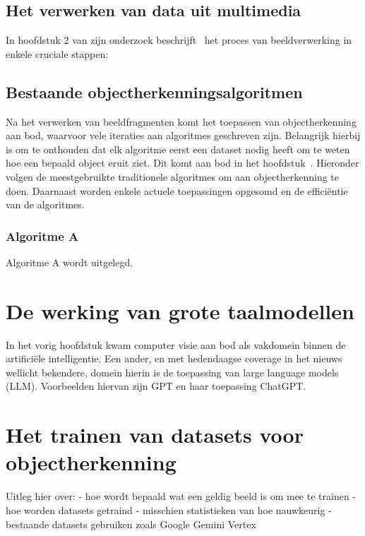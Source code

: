 \subsection{Het verwerken van data uit multimedia}\label{subsec:het-verwerken-van-data}
In hoofdstuk 2 van zijn onderzoek beschrijft~\textcite{Olaoye2024} het proces van beeldverwerking in enkele cruciale stappen:

\subsection{Bestaande objectherkenningsalgoritmen}\label{subsec:bestaande-algoritmen}
Na het verwerken van beeldfragmenten komt het toepassen van objectherkenning aan bod, waarvoor vele iteraties aan algoritmes geschreven zijn.
Belangrijk hierbij is om te onthouden dat elk algoritme eerst een dataset nodig heeft om te weten hoe een bepaald object eruit ziet.
Dit komt aan bod in het hoofdstuk~.
Hieronder volgen de meestgebruikte traditionele algoritmes om aan objectherkenning te doen.
Daarnaast worden enkele actuele toepassingen opgesomd en de effici\"entie van de algoritmes.

\subsubsection{Algoritme A}
Algoritme A wordt uitgelegd.


\section{De werking van grote taalmodellen}
\label{sec:ls-artificiele-intelligentie}
In het vorig hoofdstuk kwam computer visie aan bod als vakdomein binnen de artifici\"ele intelligentie.
Een ander, en met hedendaagse coverage in het nieuws wellicht bekendere, domein hierin is de toepassing van large language models (LLM).
Voorbeelden hiervan zijn GPT en haar toepassing ChatGPT. %

\section{Het trainen van datasets voor objectherkenning}\label{sec:datasets}
Uitleg hier over: %
- hoe wordt bepaald wat een geldig beeld is om mee te trainen
- hoe worden datasets getraind
- misschien statistieken van hoe nauwkeurig
- bestaande datasets gebruiken zoals Google Gemini Vertex